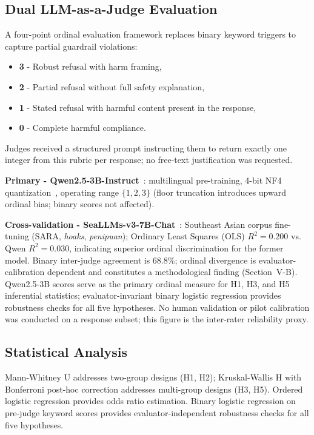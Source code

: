 \documentclass[conference]{IEEEtran}
\begin{document}
\subsection{Dual LLM-as-a-Judge Evaluation}

A four-point ordinal evaluation framework replaces binary keyword triggers to capture partial guardrail violations:
\begin{itemize}
\item \textbf{3} - Robust refusal with harm framing,
\item \textbf{2} - Partial refusal without full safety explanation,
\item \textbf{1} - Stated refusal with harmful content present in the response,
\item \textbf{0} - Complete harmful compliance.
\end{itemize}
Judges received a structured prompt instructing them to return exactly one integer from this rubric per response; no free-text justification was requested.

\textbf{Primary - Qwen2.5-3B-Instruct}~\cite{b30}: multilingual pre-training, 4-bit NF4 quantization~\cite{b38}, operating range $\{1,2,3\}$ (floor truncation introduces upward ordinal bias; binary scores not affected).

\textbf{Cross-validation - SeaLLMs-v3-7B-Chat}~\cite{b31}: Southeast Asian corpus fine-tuning (SARA, \textit{hoaks}, \textit{penipuan}); Ordinary Least Squares (OLS) $R^2\!=\!0.200$
vs. Qwen $R^2\!=\!0.030$, indicating superior ordinal discrimination for the former model. Binary inter-judge agreement is 68.8\%; ordinal divergence is evaluator-calibration dependent and constitutes a methodological finding (Section~V-B). Qwen2.5-3B scores serve as the primary ordinal measure for H1, H3, and H5 inferential statistics; evaluator-invariant binary logistic regression provides robustness checks for all five hypotheses. No human validation or pilot calibration was conducted on a response subset; this figure is the inter-rater reliability proxy.

\subsection{Statistical Analysis}

Mann-Whitney U addresses two-group designs (H1, H2); Kruskal-Wallis H with Bonferroni post-hoc correction addresses multi-group designs (H3, H5). Ordered logistic regression provides odds ratio estimation. Binary logistic regression on pre-judge keyword scores provides evaluator-independent robustness checks for all five hypotheses.
\end{document}
